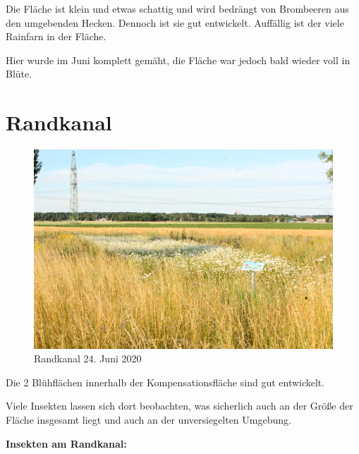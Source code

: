 \documentclass[10pt]{article}
\begin{document}
Die Fläche ist klein und etwas schattig und wird bedrängt von Brombeeren aus den umgebenden Hecken.
Dennoch ist sie gut entwickelt. Auffällig ist der viele Rainfarn in der Fläche.

Hier wurde im Juni komplett gemäht, die Fläche war jedoch bald wieder voll in Blüte.

\clearpage
\section{Randkanal}
\begin{figure}[h!]
  \includegraphics[width=\linewidth]{img/randkanal/juni.jpg}
  \caption{Randkanal 24. Juni 2020}
  \label{fig:randkanal juni}
\end{figure}

Die 2 Blühflächen innerhalb der Kompensationsfläche sind gut entwickelt.

Viele Insekten lassen sich dort beobachten, was sicherlich auch an der Größe der Fläche insgesamt liegt und auch an der unversiegelten Umgebung.

\clearpage
\textbf{Insekten am Randkanal:}
\end{document}
